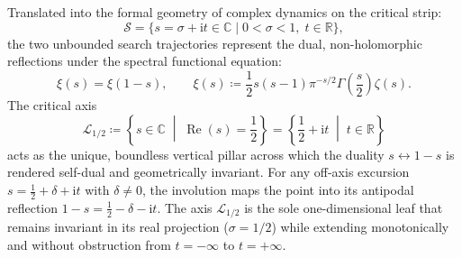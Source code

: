 \documentclass[11pt,a4paper,reqno]{article}
\theoremstyle{plain}
\theoremstyle{definition}
\theoremstyle{remark}
\numberwithin{equation}{section}
\begin{document}
Translated into the formal geometry of complex dynamics on the critical strip:
\begin{equation}
  \mathcal{S} = \big\{ s = \sigma + \mathrm{i}t \in \mathbb{C} \;\big|\; 0 < \sigma < 1,\; t \in \mathbb{R} \big\},
\end{equation}
the two unbounded search trajectories represent the dual, non-holomorphic reflections under the spectral functional equation:
\begin{equation}
  \xi(s) = \xi(1 - s), \qquad \xi(s) \coloneqq \frac{1}{2} s(s - 1) \pi^{-s/2} \Gamma\left(\frac{s}{2}\right) \zeta(s).
  \label{eq:xi_functional_eq}
\end{equation}
The critical axis
\begin{equation}
  \mathcal{L}_{1/2} \coloneqq \left\{ s \in \mathbb{C} \;\middle|\; \operatorname{Re}(s) = \frac{1}{2} \right\} = \left\{ \frac{1}{2} + \mathrm{i}t \;\middle|\; t \in \mathbb{R} \right\}
  \label{eq:critical_line_def}
\end{equation}
acts as the unique, boundless vertical pillar across which the duality $s \leftrightarrow 1 - s$ is rendered self-dual and geometrically invariant. For any off-axis excursion $s = \frac{1}{2} + \delta + \mathrm{i}t$ with $\delta \neq 0$, the involution maps the point into its antipodal reflection $1 - s = \frac{1}{2} - \delta - \mathrm{i}t$. The axis $\mathcal{L}_{1/2}$ is the sole one-dimensional leaf that remains invariant in its real projection ($\sigma = 1/2$) while extending monotonically and without obstruction from $t = -\infty$ to $t = +\infty$.
\end{document}
